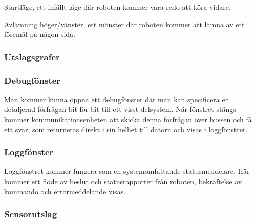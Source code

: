 \begin{packed_itemize}
\item Startläge, ett infällt läge där roboten kommer vara redo att köra vidare.
\item Avlämning höger/vänster, ett mönster där roboten kommer att lämna av ett föremål på någon sida.
\end{packed_itemize}

\subsubsection{Utslagsgrafer}

\subsubsection{Debugfönster}
Man kommer kunna öppna ett debugfönster där man kan specificera en detaljerad förfrågan bit för bit till ett visst delsystem. När fönstret stängs kommer kommunikationsenheten att skicka denna förfrågan över bussen och få ett svar, som returneras direkt i sin helhet till datorn och visas i loggfönstret.

\subsubsection{Loggfönster}
Loggfönstret kommer fungera som en systemomfattande statusmeddelare. Här kommer ett flöde av beslut och statusrapporter från roboten, bekräftelse av kommando och errormeddelande visas.

\subsubsection{Sensorutslag}



